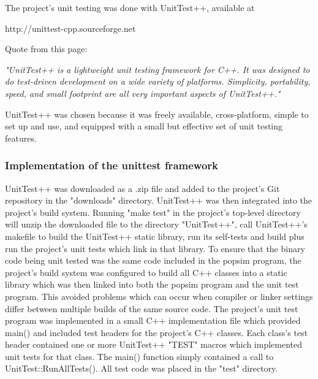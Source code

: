 \documentclass[12pt,a4paper]{article}
\begin{document}
The project's unit testing was done with UnitTest++, available at
\begin{center}
 http://unittest-cpp.sourceforge.net
\end{center}
Quote from this page:
\begin{center}
 \textit{"UnitTest++ is a lightweight unit testing framework for C++.  It was designed to do test-driven development on a wide variety of platforms. Simplicity, portability, speed, and small footprint are all very important aspects of UnitTest++."}
\end{center}

UnitTest++ was chosen because it was freely available, cross-platform, simple to set up and use, and equipped with a small but effective set of unit testing features. 
\subsubsection{Implementation of the unittest framework}
UnitTest++ was downloaded as a .zip file and added to the project's Git repository in the "downloads" directory.
UnitTest++ was then integrated into the project's build system. Running "make test" in the project's top-level directory will unzip the downloaded file to the directory "UnitTest++", call UnitTest++'s makefile to build the UnitTest++ static library, run its self-tests and build plus run the project's unit tests which link in that library.
To ensure that the binary code being unit tested was the same code included in the popsim program, the project's build system was configured to build all C++ classes into a static library which was then linked into both the popsim program and the unit test program. This avoided problems which can occur when compiler or linker settings differ between multiple builds of the same source code.
The project's unit test program was implemented in a small C++ implementation file which provided main() and included test headers for the project's C++ classes.  Each class's test header contained one or more UnitTest++ "TEST" macros which implemented unit tests for that class.  The main() function simply contained a call to UnitTest::RunAllTests(). All test code was placed in the "test" directory.
\end{document}
